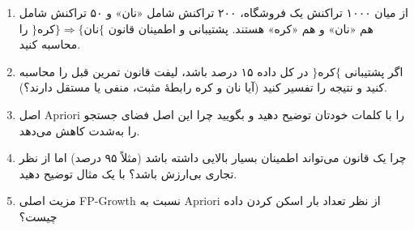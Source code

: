 \begin{enumerate}
    \item از میان ۱۰۰۰ تراکنش یک فروشگاه، ۲۰۰ تراکنش شامل «نان» و ۵۰
          تراکنش شامل هم «نان» و هم «کره» هستند. پشتیبانی و اطمینان قانون
          $\{$نان$\} \Rightarrow \{$کره$\}$ را محاسبه کنید.
    \item اگر پشتیبانی $\{$کره$\}$ در کل داده ۱۵ درصد باشد، لیفت قانون
          تمرین قبل را محاسبه کنید و نتیجه را تفسیر کنید (آیا نان و کره
          رابطهٔ مثبت، منفی یا مستقل دارند؟).
    \item اصل Apriori را با کلمات خودتان توضیح دهید و بگویید چرا این اصل
          فضای جستجو را به‌شدت کاهش می‌دهد.
    \item چرا یک قانون می‌تواند اطمینان بسیار بالایی داشته باشد (مثلاً ۹۵
          درصد) اما از نظر تجاری بی‌ارزش باشد؟ با یک مثال توضیح دهید.
    \item مزیت اصلی FP-Growth نسبت به Apriori از نظر تعداد بار اسکن کردن
          داده چیست؟
\end{enumerate}
